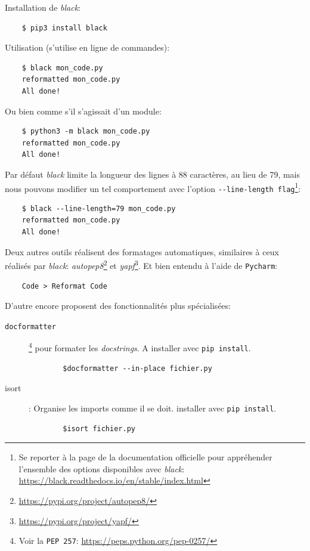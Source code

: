\documentclass[a4paper,12pt]{book}
\begin{document}
Installation de \textit{black}:
\begin{verbatim}
    $ pip3 install black
\end{verbatim}
\medskip

Utilisation (s'utilise en ligne de commandes):
\begin{verbatim}
    $ black mon_code.py
    reformatted mon_code.py
    All done!
\end{verbatim}
\medskip

Ou bien comme s'il s'agissait d'un module:
\begin{verbatim}
    $ python3 -m black mon_code.py
    reformatted mon_code.py
    All done!
\end{verbatim}
\medskip

Par défaut \textit{black} limite la longueur des lignes à 88 caractères, au lieu de 79, mais nous pouvons modifier un tel comportement avec l'option \verb|--line-length flag|\footnote{Se reporter à la page de la documentation officielle pour appréhender l'ensemble des options disponibles avec \textit{black}: \url{https://black.readthedocs.io/en/stable/index.html}}:
\begin{verbatim}
    $ black --line-length=79 mon_code.py
    reformatted mon_code.py
    All done!
\end{verbatim}
\medskip

Deux autres outils réalisent des formatages automatiques, similaires à ceux réalisés par \textit{black}: \textit{autopep8}\footnote{\url{https://pypi.org/project/autopep8/}} et \textit{yapf}\footnote{\url{https://pypi.org/project/yapf/}}. Et bien entendu à l'aide de \texttt{Pycharm}:
\begin{verbatim}
    Code > Reformat Code
\end{verbatim}

D'autre encore proposent des fonctionnalités plus spécialisées:
\begin{description}
	\item[\texttt{docformatter}]\footnote{Voir la \texttt{PEP 257}: \url{https://peps.python.org/pep-0257/}} pour formater les \textit{docstrings}. A installer avec \texttt{pip install}.
	\begin{verbatim}
	    $docformatter --in-place fichier.py
	\end{verbatim}
	\item[isort]: Organise les imports comme il se doit.  installer avec \texttt{pip install}.
	\begin{verbatim}
	    $isort fichier.py
	\end{verbatim}
\end{description}
\medskip
\end{document}
